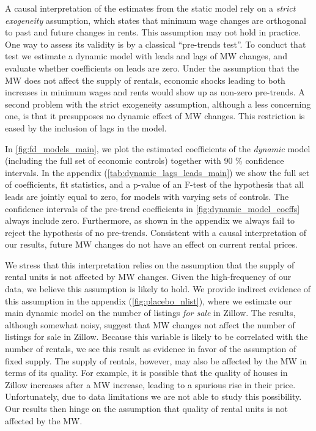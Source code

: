 A causal interpretation of the estimates from the static model rely on a \textit{strict exogeneity} 
assumption, which states that minimum wage changes are orthogonal to past and future changes in rents.
This assumption may not hold in practice. One way to assess its validity is by a classical 
``pre-trends test''. To conduct that test we estimate a dynamic model with leads and lags of MW 
changes, and evaluate whether coefficients on leads are zero. Under the assumption that the MW does 
not affect the supply of rentals, economic shocks leading to both increases in minimum wages and 
rents would show up as non-zero pre-trends. A second problem with the strict exogeneity assumption, 
although a less concerning one, is that it presupposes no dynamic effect of MW changes. This 
restriction is eased by the inclusion of lags in the model.

In \autoref{fig:fd_models_main}, we plot the estimated coefficients of the \textit{dynamic} model 
(including the full set of economic controls) together with 90 \% confidence intervals. In the appendix 
(\autoref{tab:dynamic_lags_leads_main}) we show the full set of coefficients, fit statistics, and a 
p-value of an F-test of the hypothesis that all leads are jointly equal to zero, for models with 
varying sets of controls. The confidence intervals of the pre-trend coefficients in 
\autoref{fig:dynamic_model_coeffs} always include zero. Furthermore, as shown in the appendix we always 
fail to reject the hypothesis of no pre-trends. Consistent with a causal interpretation of our results, 
future MW changes do not have an effect on current rental prices. 

We stress that this interpretation relies on the assumption that the supply of rental units is not 
affected by MW changes. Given the high-frequency of our data, we believe this assumption is likely
to hold. We provide indirect evidence of this assumption in the appendix (\autoref{fig:placebo_nlist}),
where we estimate our main dynamic model on the number of listings \textit{for sale} in Zillow. The 
results, although somewhat noisy, suggest that MW changes not affect the number of listings for sale
in Zillow. Because this variable is likely to be correlated with the number of rentals, we see this 
result as evidence in favor of the assumption of fixed supply. The supply of rentals, however, may also
be affected by the MW in terms of its quality. For example, it is possible that the quality of houses 
in Zillow increases after a MW increase, leading to a spurious rise in their price.  Unfortunately, 
due to data limitations we are not able to study this possibility. Our results then hinge on the 
assumption that quality of rental units is not affected by the MW.

